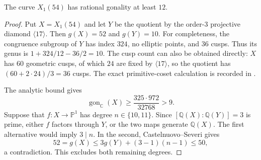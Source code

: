 \begin{lemma}\label{lem:decic54-gonality}
The curve $X_1(54)$ has rational gonality at least $12$.
\end{lemma}
\begin{proof}
Put $X=X_1(54)$ and let $Y$ be the quotient by the order-$3$
projective diamond $\langle17\rangle$.
Then $g(X)=52$ and $g(Y)=10$.
For completeness, the congruence subgroup of $Y$ has index $324$,
no elliptic points, and $36$ cusps. Thus its genus is
$1+324/12-36/2=10$.
The cusp count can also be obtained directly: $X$ has $60$ geometric
cusps, of which $24$ are fixed by $\langle17\rangle$, so the quotient
has $(60+2\cdot24)/3=36$ cusps.
The exact primitive-coset calculation is recorded in
.

The analytic bound \cite[(2.1)]{NV} gives
\[
 \operatorname{gon}_{\mathbb C}(X)
 \geq\frac{325\cdot972}{32768}>9.
\]
Suppose that $f:X\longrightarrow\mathbb P^1$ has degree
$n\in\{10,11\}$. Since $[\mathbb Q(X):\mathbb Q(Y)]=3$ is prime,
either $f$ factors through $Y$, or the two maps generate
$\mathbb Q(X)$. The first alternative would imply $3\mid n$.
In the second, Castelnuovo--Severi gives
\[
 52=g(X)\leq 3g(Y)+(3-1)(n-1)\leq50,
\]
a contradiction. This excludes both remaining degrees.
\end{proof}
